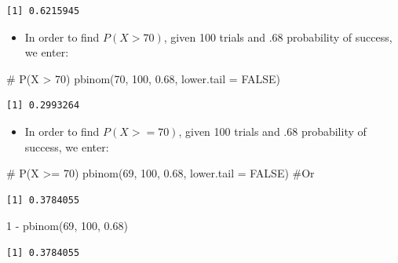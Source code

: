 \documentclass[
  letterpaper,
  DIV=11,
  numbers=noendperiod]{scrreprt}
\newenvironment{Shaded}{\begin{snugshade}}{\end{snugshade}}
\newcommand{\AttributeTok}[1]{\textcolor[rgb]{0.40,0.45,0.13}{#1}}
\newcommand{\CommentTok}[1]{\textcolor[rgb]{0.37,0.37,0.37}{#1}}
\newcommand{\ConstantTok}[1]{\textcolor[rgb]{0.56,0.35,0.01}{#1}}
\newcommand{\DecValTok}[1]{\textcolor[rgb]{0.68,0.00,0.00}{#1}}
\newcommand{\FloatTok}[1]{\textcolor[rgb]{0.68,0.00,0.00}{#1}}
\newcommand{\FunctionTok}[1]{\textcolor[rgb]{0.28,0.35,0.67}{#1}}
\newcommand{\NormalTok}[1]{\textcolor[rgb]{0.00,0.23,0.31}{#1}}
\newcommand{\SpecialCharTok}[1]{\textcolor[rgb]{0.37,0.37,0.37}{#1}}
\providecommand{\tightlist}{%
  \setlength{\itemsep}{0pt}\setlength{\parskip}{0pt}}\usepackage{longtable,booktabs,array}
\begin{document}
\begin{verbatim}
[1] 0.6215945
\end{verbatim}

\begin{itemize}
\tightlist
\item
  In order to find \(P(X > 70)\), given 100 trials and .68 probability
  of success, we enter:
\end{itemize}

\begin{Shaded}
\begin{Highlighting}[]
\CommentTok{\# P(X \textgreater{} 70)}
\FunctionTok{pbinom}\NormalTok{(}\DecValTok{70}\NormalTok{, }\DecValTok{100}\NormalTok{, }\FloatTok{0.68}\NormalTok{, }\AttributeTok{lower.tail =} \ConstantTok{FALSE}\NormalTok{)}
\end{Highlighting}
\end{Shaded}

\begin{verbatim}
[1] 0.2993264
\end{verbatim}

\begin{itemize}
\tightlist
\item
  In order to find \(P(X >= 70)\), given 100 trials and .68 probability
  of success, we enter:
\end{itemize}

\begin{Shaded}
\begin{Highlighting}[]
\CommentTok{\# P(X \textgreater{}= 70)}
\FunctionTok{pbinom}\NormalTok{(}\DecValTok{69}\NormalTok{, }\DecValTok{100}\NormalTok{, }\FloatTok{0.68}\NormalTok{, }\AttributeTok{lower.tail =} \ConstantTok{FALSE}\NormalTok{)  }\CommentTok{\#Or}
\end{Highlighting}
\end{Shaded}

\begin{verbatim}
[1] 0.3784055
\end{verbatim}

\begin{Shaded}
\begin{Highlighting}[]
\DecValTok{1} \SpecialCharTok{{-}} \FunctionTok{pbinom}\NormalTok{(}\DecValTok{69}\NormalTok{, }\DecValTok{100}\NormalTok{, }\FloatTok{0.68}\NormalTok{)}
\end{Highlighting}
\end{Shaded}

\begin{verbatim}
[1] 0.3784055
\end{verbatim}
\end{document}

